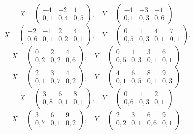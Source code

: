 $$ X = \left(\begin{array}{*{3}{c}} -4 & -2 & 1 \\ 0{,}1 & 0{,}4 & 0{,}5 \end{array}\right), \quad Y = \left(\begin{array}{*{3}{c}} -4 & -3 & -1 \\ 0{,}1 & 0{,}3 & 0{,}6 \end{array}\right). $$
$$ X = \left(\begin{array}{*{4}{c}} -2 & -1 & 2 & 4 \\ 0{,}6 & 0{,}1 & 0{,}2 & 0{,}1 \end{array}\right), \quad Y = \left(\begin{array}{*{4}{c}} 0 & 1 & 4 & 7 \\ 0{,}5 & 0{,}3 & 0{,}1 & 0{,}1 \end{array}\right). $$
$$ X = \left(\begin{array}{*{3}{c}} 0 & 2 & 4 \\ 0{,}2 & 0{,}2 & 0{,}6 \end{array}\right), \quad Y = \left(\begin{array}{*{4}{c}} 0 & 1 & 3 & 6 \\ 0{,}5 & 0{,}3 & 0{,}1 & 0{,}1 \end{array}\right). $$
$$ X = \left(\begin{array}{*{3}{c}} 2 & 3 & 4 \\ 0{,}1 & 0{,}7 & 0{,}2 \end{array}\right), \quad Y = \left(\begin{array}{*{4}{c}} 4 & 6 & 8 & 9 \\ 0{,}1 & 0{,}5 & 0{,}1 & 0{,}3 \end{array}\right). $$
$$ X = \left(\begin{array}{*{3}{c}} 3 & 6 & 8 \\ 0{,}8 & 0{,}1 & 0{,}1 \end{array}\right), \quad Y = \left(\begin{array}{*{3}{c}} 0 & 1 & 2 \\ 0{,}6 & 0{,}3 & 0{,}1 \end{array}\right). $$
$$ X = \left(\begin{array}{*{3}{c}} 3 & 6 & 9 \\ 0{,}7 & 0{,}1 & 0{,}2 \end{array}\right), \quad Y = \left(\begin{array}{*{4}{c}} 2 & 3 & 6 & 9 \\ 0{,}2 & 0{,}1 & 0{,}6 & 0{,}1 \end{array}\right). $$
